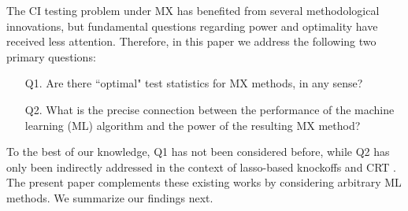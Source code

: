 \documentclass[12pt]{article}
\theoremstyle{definition}
\theoremstyle{remark}
\newcommand{\prx}{\bm X}
\newcommand{\srx}{X}
\newcommand{\prz}{\bm Z}
\newcommand{\srz}{Z}
\newcommand{\srxk}{\widetilde X}
\newcommand{\pry}{{\bm Y}}
\newcommand{\sry}{Y}
\begin{document}
The CI testing problem under MX has benefited from several methodological innovations, but fundamental questions regarding power and optimality have received less attention. Therefore, in this paper we address the following two primary questions:
\begin{enumerate}
	\item[Q1.] Are there ``optimal" test statistics for MX methods, in any sense?
	\item[Q2.] What is the precise connection between the performance of the machine learning (ML) algorithm and the power of the resulting MX method?
\end{enumerate}
To the best of our knowledge, Q1 has not been considered before, while Q2 has only been indirectly addressed in the context of lasso-based knockoffs \cite{Weinstein2017, Liu2019, Fan2020, Weinstein2020} and CRT \cite{Wang2020b, Celentano2020}. The present paper complements these existing works by considering arbitrary ML methods. We summarize our findings next.


\end{document}
